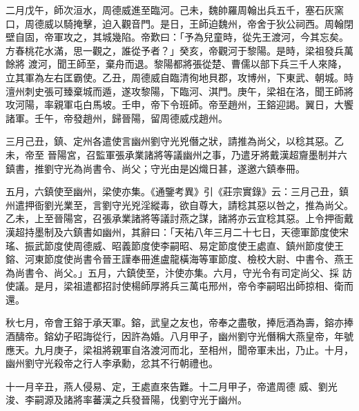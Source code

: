 \begin{pinyinscope}
 二月戊午，師次洹水，周德威進至臨河。己未，魏帥羅周翰出兵五千，塞石灰窯口，周德威以騎掩擊，迫入觀音門。是日，王師迫魏州，帝舍于狄公祠西。周翰閉壁自固，帝軍攻之，其城幾陷。帝歎曰：「予為兒童時，從先王渡河，今其忘矣。方春桃花水滿，思一觀之，誰從予者？」癸亥，帝觀河于黎陽。是時，梁祖發兵萬餘將
 渡河，聞王師至，棄舟而退。黎陽都將張從楚、曹儒以部下兵三千人來降，立其軍為左右匡霸使。乙丑，周德威自臨清徇地貝郡，攻博州，下東武、朝城。時澶州刺史張可臻棄城而遁，遂攻黎陽，下臨河、淇門。庚午，梁祖在洛，聞王師將攻河陽，率親軍屯白馬坡。壬申，帝下令班師。帝至趙州，王鎔迎謁。翼日，大饗諸軍。壬午，帝發趙州，歸晉陽，留周德威戍趙州。



 三月己丑，鎮、定州各遣使言幽州劉守光兇僭之狀，請推為尚父，以稔其惡。乙未，帝至
 晉陽宮，召監軍張承業諸將等議幽州之事，乃遣牙將戴漢超齎墨制并六鎮書，推劉守光為尚書令、尚父；守光由是凶熾日甚，遂邀六鎮奉冊。



 五月，六鎮使至幽州，梁使亦集。《通鑒考異》引《莊宗實錄》云：三月己丑，鎮州遣押衙劉光業至，言劉守光兇淫縱毒，欲自尊大，請稔其惡以咎之，推為尚父。乙未，上至晉陽宮，召張承業諸將等議討燕之謀，諸將亦云宜稔其惡。上令押衙戴漢超持墨制及六鎮書如幽州，其辭曰：「天祐八年三月二十七日，天德軍節度使宋瑤、振武節度使周德威、昭義節度使李嗣昭、易定節度使王處直、鎮州節度使王鎔、河東節度使尚書令晉王謹奉冊進盧龍橫海等軍節度、檢校大尉、中書令、燕王為尚書令、尚父。」五月，六鎮使至，汴使亦集。六月，守光令有司定尚父、採
 訪使議。是月，梁祖遣都招討使楊師厚將兵三萬屯邢州，帝令李嗣昭出師掠相、衛而還。



 秋七月，帝會王鎔于承天軍。鎔，武皇之友也，帝奉之盡敬，捧卮酒為壽，鎔亦捧酒醻帝。鎔幼子昭誨從行，因許為婚。八月甲子，幽州劉守光僭稱大燕皇帝，年號應天。九月庚子，梁祖將親軍自洛渡河而北，至相州，聞帝軍未出，乃止。十月，幽州劉守光殺帝之行人李承勳，忿其不行朝禮也。



 十一月辛丑，燕人侵易、定，王處直來告難。十二月甲子，帝遣周德
 威、劉光浚、李嗣源及諸將率蕃漢之兵發晉陽，伐劉守光于幽州。



\end{pinyinscope}